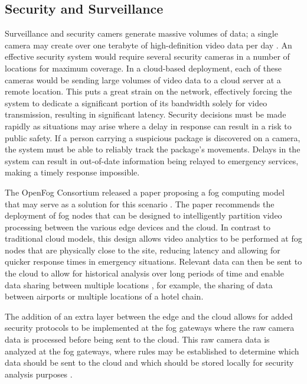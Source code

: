 \documentclass{article}
\begin{document}
\subsection{Security and Surveillance}
Surveillance and security camers generate massive volumes of data; a single camera may create over one terabyte of high-definition video data per day \cite{openfogconsortium2017visualsecurity}. An effective security system would require several security cameras in a number of locations for maximum coverage. In a cloud-based deployment, each of these cameras would be sending large volumes of video data to a cloud server at a remote location. This puts a great strain on the network, effectively forcing the system to dedicate a significant portion of its bandwidth solely for video transmission, resulting in significant latency. Security decisions must be made rapidly as situations may arise where a delay in response can result in a risk to public safety. If a person carrying a suspicious package is discovered on a camera, the system must be able to reliably track the package's movements. Delays in the system can result in out-of-date information being relayed to emergency services, making a timely response impossible.

The OpenFog Consortium released a paper proposing a fog computing model that may serve as a solution for this scenario \cite{openfogconsortium2017visualsecurity}. The paper recommends the deployment of fog nodes that can be designed to intelligently partition video processing between the various edge devices and the cloud. In contrast to traditional cloud models, this design allows video analytics to be performed at fog nodes that are physically close to the site, reducing latency and allowing for quicker response times in emergency situations. Relevant data can then be sent to the cloud to allow for historical analysis over long periods of time and enable data sharing between multiple locations \cite{openfogconsortium2017visualsecurity}, for example, the sharing of data between airports or multiple locations of a hotel chain.

The addition of an extra layer between the edge and the cloud allows for added security protocols to be implemented at the fog gateways where the raw camera data is processed before being sent to the cloud. This raw camera data is analyzed at the fog gateways, where rules may be established to determine which data should be sent to the cloud and which should be stored locally for security analysis purposes \cite{openfogconsortium2017visualsecurity}.
\end{document}

